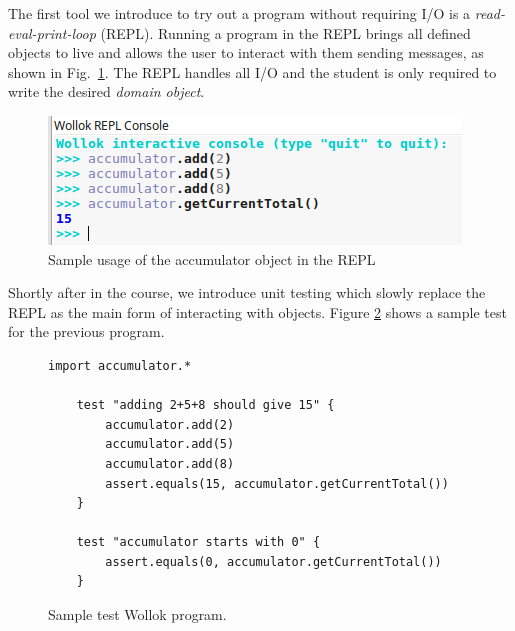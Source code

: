 The first tool we introduce to try out a program without requiring I/O is a \emph {read-eval-print-loop} (REPL). Running a program in the REPL brings all defined objects to live and allows the user to interact with them sending messages, as shown in Fig.~\ref{fig:repl}. 
The REPL handles all I/O and the student is only required to write the desired \emph{domain object}.

\begin{figure}[ht]
 \centering
 \includegraphics[scale=0.6]{images/accumulator-repl.png}
 \caption{\small Sample usage of the accumulator object in the REPL}
 \label{fig:repl}
\end{figure}




Shortly after in the course, we introduce unit testing which slowly replace the REPL as the main form of interacting with objects. Figure \ref{fig:test} shows a sample test for the previous program. 

\begin{figure}[ht]
 \centering
 \begin{lstlisting}[language=Wollok]
 	import accumulator.*

	test "adding 2+5+8 should give 15" {
		accumulator.add(2)
		accumulator.add(5)
		accumulator.add(8)
		assert.equals(15, accumulator.getCurrentTotal())		
	}
   
	test "accumulator starts with 0" {
		assert.equals(0, accumulator.getCurrentTotal())
	}
 \end{lstlisting}
 
 \caption{\small Sample test Wollok program.}
 \label{fig:test}
\end{figure}

